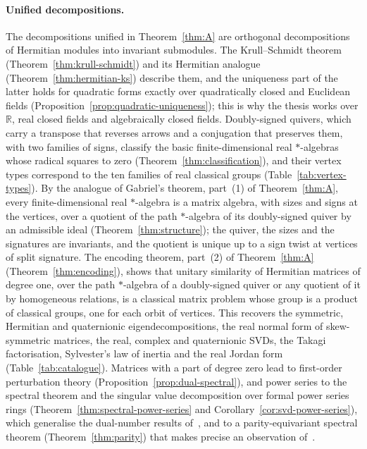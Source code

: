 \documentclass[12pt, a4paper]{report}
\theoremstyle{plain}
\theoremstyle{definition}
\theoremstyle{remark}
\theoremstyle{plain}
\newcommand{\RR}{\mathbb{R}}
\begin{document}
\paragraph{Unified decompositions.} The decompositions unified in Theorem~\ref{thm:A} are orthogonal decompositions of Hermitian modules into invariant submodules. The Krull--Schmidt theorem (Theorem~\ref{thm:krull-schmidt}) and its Hermitian analogue (Theorem~\ref{thm:hermitian-ks}) describe them, and the uniqueness part of the latter holds for quadratic forms exactly over quadratically closed and Euclidean fields (Proposition~\ref{prop:quadratic-uniqueness}); this is why the thesis works over $\RR$, real closed fields and algebraically closed fields. Doubly-signed quivers, which carry a transpose that reverses arrows and a conjugation that preserves them, with two families of signs, classify the basic finite-dimensional real $*$-algebras whose radical squares to zero (Theorem~\ref{thm:classification}), and their vertex types correspond to the ten families of real classical groups (Table~\ref{tab:vertex-types}). By the analogue of Gabriel's theorem, part~(1) of Theorem~\ref{thm:A}, every finite-dimensional real $*$-algebra is a matrix algebra, with sizes and signs at the vertices, over a quotient of the path $*$-algebra of its doubly-signed quiver by an admissible ideal (Theorem~\ref{thm:structure}); the quiver, the sizes and the signatures are invariants, and the quotient is unique up to a sign twist at vertices of split signature. The encoding theorem, part~(2) of Theorem~\ref{thm:A} (Theorem~\ref{thm:encoding}), shows that unitary similarity of Hermitian matrices of degree one, over the path $*$-algebra of a doubly-signed quiver or any quotient of it by homogeneous relations, is a classical matrix problem whose group is a product of classical groups, one for each orbit of vertices. This recovers the symmetric, Hermitian and quaternionic eigendecompositions, the real normal form of skew-symmetric matrices, the real, complex and quaternionic SVDs, the Takagi factorisation, Sylvester's law of inertia and the real Jordan form (Table~\ref{tab:catalogue}). Matrices with a part of degree zero lead to first-order perturbation theory (Proposition~\ref{prop:dual-spectral}), and power series to the spectral theorem and the singular value decomposition over formal power series rings (Theorem~\ref{thm:spectral-power-series} and Corollary~\ref{cor:svd-power-series}), which generalise the dual-number results of~\cite{Gutin2022DualNumbers}, and to a parity-equivariant spectral theorem (Theorem~\ref{thm:parity}) that makes precise an observation of~\cite{Gutin2024Clifford}.
\end{document}
